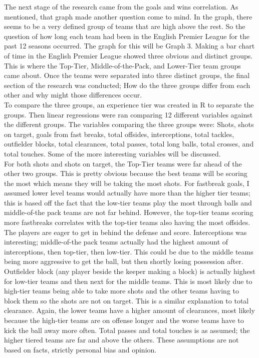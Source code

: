 \documentclass[12pt,english]{article}
\begin{document}
\indent The next stage of the research came from the goals and wins correlation. As mentioned, that graph made another question come to mind. In the graph, there seems to be a very defined group of teams that are high above the rest. So the question of how long each team had been in the English Premier League for the past 12 seasons occurred. The graph for this will be Graph 3. Making a bar chart of time in the English Premier League showed three obvious and distinct groups. This is where the Top-Tier, Middle-of-the-Pack, and Lower-Tier team groups came about. Once the teams were separated into three distinct groups, the final section of the research was conducted; How do the three groups differ from each other and why might those differences occur.\\
\indent To compare the three groups, an experience tier was created in R to separate the groups. Then linear regressions were ran comparing 12 different variables against the different groups. The variables comparing the three groups were: Shots, shots on target, goals from fast breaks, total offsides, interceptions, total tackles, outfielder blocks, total clearances, total passes, total long balls, total crosses, and total touches. Some of the more interesting variables will be discussed. \\
\indent For both shots and shots on target, the Top-Tier teams were far ahead of the other two groups. This is pretty obvious because the best teams will be scoring the most which means they will be taking the most shots. For fastbreak goals, I assumed lower level teams would actually have more than the higher tier teams; this is based off the fact that the low-tier teams play the most through balls and middle-of-the pack teams are not far behind. However, the top-tier teams scoring more fastbreaks correlates with the top-tier teams also having the most offsides. The players are eager to get in behind the defense and score. Interceptions was interesting; middle-of-the pack teams actually had the highest amount of interceptions, then top-tier, then low-tier. This could be due to the middle teams being more aggressive to get the ball, but then shortly losing possession after. Outfielder block (any player beside the keeper making a block) is actually highest for low-tier teams and then next for the middle teams. This is most likely due to high-tier teams being able to take more shots and the other teams having to block them so the shots are not on target. This is a similar explanation to total clearance. Again, the lower teams have a higher amount of clearances, most likely because the high-tier teams are on offense longer and the worse teams have to kick the ball away more often. Total passes and total touches is as assumed; the higher tiered teams are far and above the others. These assumptions are not based on facts, strictly personal bias and opinion. 
\end{document}
